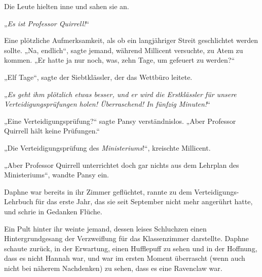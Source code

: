 Die Leute hielten inne und sahen sie an.

„\emph{Es ist Professor Quirrell!}“

Eine plötzliche Aufmerksamkeit, als ob ein langjähriger Streit geschlichtet werden sollte.
„Na, endlich“, sagte jemand, während Millicent versuchte, zu Atem zu kommen. „Er hatte ja nur noch, was, zehn Tage, um gefeuert zu werden?“

„Elf Tage“, sagte der Siebtklässler, der das Wettbüro leitete.

„\emph{Es geht ihm plötzlich etwas besser, und er wird die Erstklässler für unsere Verteidigungsprüfungen holen! Überraschend! In fünfzig Minuten!}“

„Eine Verteidigungsprüfung?“ sagte Pansy verständnislos. „Aber Professor Quirrell hält keine Prüfungen.“

„Die Verteidigungsprüfung des \emph{Ministeriums}!“, kreischte Millicent.

„Aber Professor Quirrell unterrichtet doch gar nichts aus dem Lehrplan des Ministeriums“, wandte Pansy ein.

Daphne war bereits in ihr Zimmer geflüchtet, rannte zu dem Verteidigungs-Lehrbuch für das erste Jahr, das sie seit September nicht mehr angerührt hatte, und schrie in Gedanken Flüche.

\later

Ein Pult hinter ihr weinte jemand, dessen leises Schluchzen einen Hintergrundgesang der Verzweiflung für das Klassenzimmer darstellte. Daphne schaute zurück, in der Erwartung, einen Hufflepuff zu sehen und in der Hoffnung, dass es nicht Hannah war, und war im ersten Moment überrascht (wenn auch nicht bei näherem Nachdenken) zu sehen, dass es eine Ravenclaw war.

